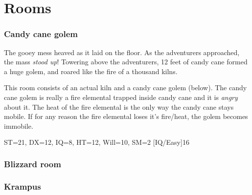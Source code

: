 \documentclass[a4paper,twocolumn]{memoir}
\begin{document}
\chapter{Rooms}
\label{cha:rooms}

\subsection{Candy cane golem}
\label{sec:candy-cane-golem}

\begin{vignette}
  The gooey mess heaved as it laid on the floor. As the adventurers approached,
  the mass \emph{stood up}! Towering above the adventurers, 12 feet of candy
  cane formed a huge golem, and roared like the fire of a thousand kilns. 
\end{vignette}

This room consists of an actual kiln and a candy cane golem (below). The candy
cane golem is really a fire elemental trapped inside candy cane and it is
\emph{angry} about it. The heat of the fire elemental is the only way the candy
cane stays mobile. If for any reason the fire elemental loses it's fire/heat,
the golem becomes immobile.


\begin{character}{
    ST=21,
    DX=12,
    IQ=8,
    HT=12,
    Will=10,
    SM=2
  }
  [IQ/Easy]{16}
\end{character}

\subsection{Blizzard room}
\label{sec:blizzard-room}


\subsection{Krampus}
\label{sec:krampus}

\end{document}
